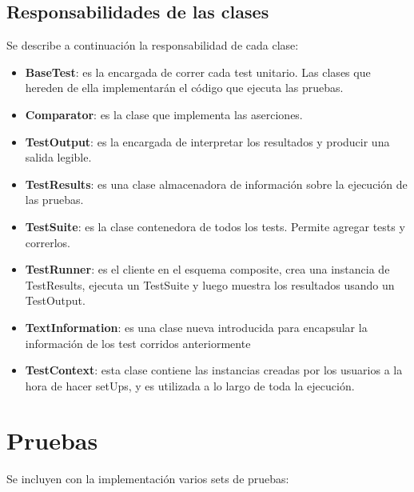 \documentclass[12pt]{article}
\begin{document}
\subsection{Responsabilidades de las clases}
Se describe a continuación la responsabilidad de cada clase:
\begin{itemize}
	\item \textbf{BaseTest}: es la encargada de correr cada test unitario.
		Las clases que hereden de ella implementarán el código que 
		ejecuta las pruebas. 
		
	\item \textbf{Comparator}: es la clase que implementa las aserciones.	
	
	\item \textbf{TestOutput}: es la encargada de interpretar los resultados
		y producir una salida legible.		
			
	\item \textbf{TestResults}: es una clase almacenadora de información
		sobre la ejecución de las pruebas.
	
	\item \textbf{TestSuite}: es la clase contenedora de todos los tests.
		Permite agregar tests y correrlos.
		
	\item \textbf{TestRunner}: es el cliente en el esquema composite, crea
		una instancia de TestResults, ejecuta un TestSuite y luego
		muestra los resultados usando un TestOutput.	
		
	\item \textbf{TextInformation}: es una clase nueva introducida para 
		encapsular la información de los test corridos anteriormente
	
	\item \textbf{TestContext}: esta clase contiene las instancias creadas
		por los usuarios a la hora de hacer setUps, y es utilizada
		a lo largo de toda la ejecución.

\end{itemize}

\section{Pruebas}
Se incluyen con la implementación varios sets de pruebas:
\end{document}
